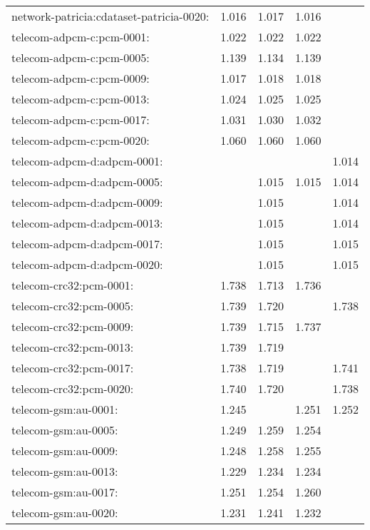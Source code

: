 \begin{longtable}{lrrrr}
network-patricia:cdataset-patricia-0020: & 1.016 & 1.017 & 1.016 & \color{Green}{1.099} \\
telecom-adpcm-c:pcm-0001: & 1.022 & 1.022 & 1.022 & \color{Green}{1.046} \\
telecom-adpcm-c:pcm-0005: & 1.139 & 1.134 & 1.139 & \color{Green}{1.163} \\
telecom-adpcm-c:pcm-0009: & 1.017 & 1.018 & 1.018 & \color{Green}{1.043} \\
telecom-adpcm-c:pcm-0013: & 1.024 & 1.025 & 1.025 & \color{Green}{1.043} \\
telecom-adpcm-c:pcm-0017: & 1.031 & 1.030 & 1.032 & \color{Green}{1.053} \\
telecom-adpcm-c:pcm-0020: & 1.060 & 1.060 & 1.060 & \color{Green}{1.071} \\
telecom-adpcm-d:adpcm-0001: & \color{Green}{1.016} & \color{Green}{1.016} & \color{Green}{1.016} & 1.014 \\
telecom-adpcm-d:adpcm-0005: & \color{Green}{1.016} & 1.015 & 1.015 & 1.014 \\
telecom-adpcm-d:adpcm-0009: & \color{Green}{1.016} & 1.015 & \color{Green}{1.016} & 1.014 \\
telecom-adpcm-d:adpcm-0013: & \color{Green}{1.016} & 1.015 & \color{Green}{1.016} & 1.014 \\
telecom-adpcm-d:adpcm-0017: & \color{Green}{1.016} & 1.015 & \color{Green}{1.016} & 1.015 \\
telecom-adpcm-d:adpcm-0020: & \color{Green}{1.016} & 1.015 & \color{Green}{1.016} & 1.015 \\
telecom-crc32:pcm-0001: & 1.738 & 1.713 & 1.736 & \color{Green}{1.742} \\
telecom-crc32:pcm-0005: & 1.739 & 1.720 & \color{Green}{1.743} & 1.738 \\
telecom-crc32:pcm-0009: & 1.739 & 1.715 & 1.737 & \color{Green}{1.750} \\
telecom-crc32:pcm-0013: & 1.739 & 1.719 & \color{Green}{1.743} & \color{Green}{1.743} \\
telecom-crc32:pcm-0017: & 1.738 & 1.719 & \color{Green}{1.742} & 1.741 \\
telecom-crc32:pcm-0020: & 1.740 & 1.720 & \color{Green}{1.744} & 1.738 \\
telecom-gsm:au-0001: & 1.245 & \color{Green}{1.254} & 1.251 & 1.252 \\
telecom-gsm:au-0005: & 1.249 & 1.259 & 1.254 & \color{Green}{1.260} \\
telecom-gsm:au-0009: & 1.248 & 1.258 & 1.255 & \color{Green}{1.260} \\
telecom-gsm:au-0013: & 1.229 & 1.234 & 1.234 & \color{Green}{1.243} \\
telecom-gsm:au-0017: & 1.251 & 1.254 & 1.260 & \color{Green}{1.266} \\
telecom-gsm:au-0020: & 1.231 & 1.241 & 1.232 & \color{Green}{1.246} \\
\end{longtable}
